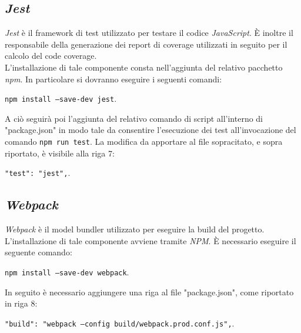 \subsection{\textit{Jest}}\label{jest}
\textit{Jest} è il framework di test utilizzato per testare il codice \textit{JavaScript}. È inoltre il responsabile della generazione dei report di coverage utilizzati in seguito per il calcolo del code coverage.\\
L'installazione di tale componente consta nell'aggiunta del relativo pacchetto \textit{npm}. In particolare si dovranno eseguire i seguenti comandi:
\begin{center}
\texttt{npm install --save-dev jest}.
\end{center}
A ciò seguirà poi l'aggiunta del relativo comando di script all'interno di "package.json" in modo tale da consentire l'esecuzione dei test all'invocazione del comando \texttt{npm run test}. La modifica da apportare al file sopracitato, e sopra riportato, è visibile alla riga 7:
\begin{center}
	\texttt{"test": "jest",}.
\end{center}

\subsection{\textit{Webpack}}\label{webpack}
\textit{Webpack} è il model bundler utilizzato per eseguire la build del progetto.\\
L'installazione di tale componente avviene tramite \textit{NPM}. È necessario eseguire il seguente comando:
\begin{center}
	\texttt{npm install --save-dev webpack}.
\end{center}
In seguito è necessario aggiungere una riga al file "package.json", come riportato in riga 8:
\begin{center}
	\texttt{"build": "webpack --config build/webpack.prod.conf.js",}.
\end{center}


